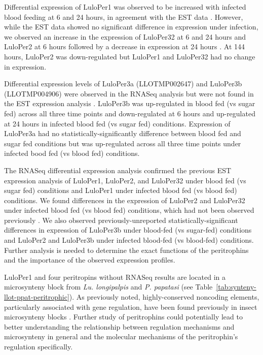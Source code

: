 Differential expression of LuloPer1 was observed to be increased with infected blood feeding at 6 and 24 hours, in agreement with the EST data \cite{Jochim2008,Dostalova2012}.  However, while the EST data showed no significant difference in expression under infection, we observed an increase in the expression of LuloPer32 at 6 and 24 hours and LuloPer2 at 6 hours followed by a decrease in expression at 24 hours \cite{Jochim2008}.  At 144 hours, LuloPer2 was down-regulated but LuloPer1 and LuloPer32 had no change in expression.

Differential expression levels of LuloPer3a (LLOTMP002647) and LuloPer3b (LLOTMP004906) were observed in the RNASeq analysis but were not found in the EST expression analysis \cite{Jochim2008}. LuloPer3b was up-regulated in blood fed (vs sugar fed) across all three time points and down-regulated at 6 hours and up-regulated at 24 hours in infected blood fed (vs sugar fed) conditions.  Expression of LuloPer3a had no statistically-significantly difference between blood fed and sugar fed conditions but was up-regulated across all three time points under infected bood fed (vs blood fed) conditions.

The RNASeq differential expression analysis confirmed the previous EST expression analysis of LuloPer1, LuloPer2, and LuloPer32 under blood fed (vs sugar fed) conditions and LuloPer1 under infected blood fed (vs blood fed) conditions.  We found differences in the expression of LuloPer2 and LuloPer32 under infected blood fed (vs blood fed) conditions, which had not been observed previously \cite{Jochim2008,Dostalova2012}.  We also observed previously-unreported statistically-significant differences in expression of LuloPer3b under blood-fed (vs sugar-fed) conditions and LuloPer2 and LuloPer3b under infected blood-fed (vs blood-fed) conditions. Further analysis is needed to determine the exact functions of the peritrophins and the importance of the observed expression profiles.

LuloPer1 and four peritropins without RNASeq results are located in a microsynteny block from \emph{Lu. longipalpis} and \emph{P. papatasi} (see Table~\ref{tab:synteny-llot-ppat-peritrophic}). As previously noted, highly-conserved noncoding elements, particularly associated with gene regulation, have been found previously in insect microsynteny blocks \cite{Engstrom2007}.  Further study of peritrophins could potentially lead to  better understanding the relationship between regulation mechanisms and microsynteny in general and the molecular mechanisms of the peritrophin's regulation specifically.

